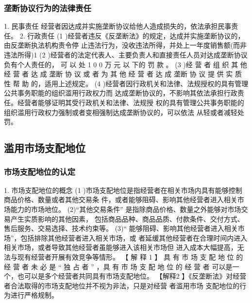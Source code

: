 \documentclass[UTF8,12pt]{ctexart}
\numberwithin{equation}{section} %
\numberwithin{figure}{section}
\numberwithin{table}{section}
\begin{document}
	
	
	\subsubsection{垄断协议行为的法律责任}
	1. 民事责任
	经营者因达成并实施垄断协议给他人造成损失的，依法承担民事责任。
	2. 行政责任
	(1 )经营者违反《反垄断法》的规定，达成并实施垄断协议的，由反垄断执法机构责令停 止违法行为，没收违法所得，并处上一年度销售额(而非违法所得)1%
	(2 )经营者的法定代表人、主要负责人和直接责任人员对达成垄断协议负有个人责任的， 可 以 处 1 0 0 万 元 以 下的 罚 款 。
	(3 )经 营 者 组 织 其 他 经 营 者 达 成 垄断 协 议 或 者 为 其 他 经 营 者 达 成 垄断 协 议 提 供 实 质 性 帮 助 的，适用上述规定。
	(4 )经营者因行政机关和法律、法规授权的具有管理公共事务职能的组织滥用行政权力而 达成垄断协议的，不影响其依法承担行政责任。经营者能够证明其受行政机关和法律、法规授 权的具有管理公共事务职能的组织滥用行政权力强制或者变相强制达成垄断协议的，可以依法 从轻或者减轻处罚。
	
	
	\subsection{滥用市场支配地位}
	
	\subsubsection{市场支配地位的认定}
	1. 市场支配地位的概念
	(1 )市场支配地位是指经营者在相关市场内具有能够控制商品价格、数量或者其他交易条 件，或者能够阻碍、影响其他经营者进入相关市场能力的市场地位。
	(2)“其他交易条件” 是指除商品价格、数量之外能够对市场交易产生实质影响的其他因素， 包括商品品种、商品品质、付款条件、交付方式、售后服务、交易选择、技术约束等。
	(3)“ 能够阻碍、影响其他经营者进入相关市场”，包括排除其他经营者进入相关市场，或 者延缓其他经营者在合理时间内进入相关市场，或者导致其他经营者虽能够进入该相关市场但 进入成本大幅提高，无法与现有经营者开展有效竞争等情形。
	【 解 释 1 】 具 有 市 场 支 配 地 位 的 经 营 者 未 必 是 “ 独 占 者 ” ，具 有 市 场 支 配 地 位 的 经 营 者 可以是一个，也可以是多个经营者共同具有市场支配地位。
	【解释2 】《反垄断法》对经营者合法取得的市场支配地位并不视为非法，只是对经营 者滥用市场 支配地位的行为进行严格规制。
	
\end{document}
